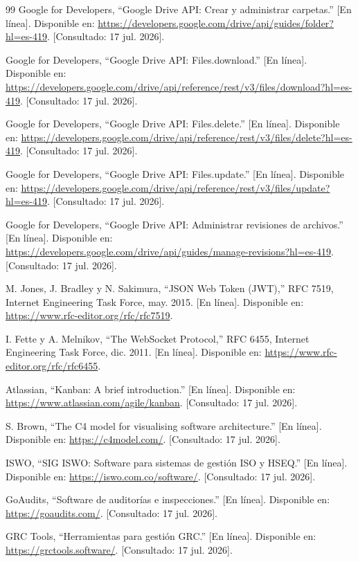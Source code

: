 \documentclass[final]{udpthesis}
\begin{document}
\begin{thebibliography}{99}
Google for Developers, ``Google Drive API: Crear y administrar carpetas.'' [En línea]. Disponible en: \url{https://developers.google.com/drive/api/guides/folder?hl=es-419}. [Consultado: 17 jul. 2026].

Google for Developers, ``Google Drive API: Files.download.'' [En línea]. Disponible en: \url{https://developers.google.com/drive/api/reference/rest/v3/files/download?hl=es-419}. [Consultado: 17 jul. 2026].

Google for Developers, ``Google Drive API: Files.delete.'' [En línea]. Disponible en: \url{https://developers.google.com/drive/api/reference/rest/v3/files/delete?hl=es-419}. [Consultado: 17 jul. 2026].

Google for Developers, ``Google Drive API: Files.update.'' [En línea]. Disponible en: \url{https://developers.google.com/drive/api/reference/rest/v3/files/update?hl=es-419}. [Consultado: 17 jul. 2026].

Google for Developers, ``Google Drive API: Administrar revisiones de archivos.'' [En línea]. Disponible en: \url{https://developers.google.com/drive/api/guides/manage-revisions?hl=es-419}. [Consultado: 17 jul. 2026].

M. Jones, J. Bradley y N. Sakimura, ``JSON Web Token (JWT),'' RFC 7519, Internet Engineering Task Force, may. 2015. [En línea]. Disponible en: \url{https://www.rfc-editor.org/rfc/rfc7519}.

I. Fette y A. Melnikov, ``The WebSocket Protocol,'' RFC 6455, Internet Engineering Task Force, dic. 2011. [En línea]. Disponible en: \url{https://www.rfc-editor.org/rfc/rfc6455}.

Atlassian, ``Kanban: A brief introduction.'' [En línea]. Disponible en: \url{https://www.atlassian.com/agile/kanban}. [Consultado: 17 jul. 2026].

S. Brown, ``The C4 model for visualising software architecture.'' [En línea]. Disponible en: \url{https://c4model.com/}. [Consultado: 17 jul. 2026].

ISWO, ``SIG ISWO: Software para sistemas de gestión ISO y HSEQ.'' [En línea]. Disponible en: \url{https://iswo.com.co/software/}. [Consultado: 17 jul. 2026].

GoAudits, ``Software de auditorías e inspecciones.'' [En línea]. Disponible en: \url{https://goaudits.com/}. [Consultado: 17 jul. 2026].

GRC Tools, ``Herramientas para gestión GRC.'' [En línea]. Disponible en: \url{https://grctools.software/}. [Consultado: 17 jul. 2026].

\end{thebibliography}
\end{document}

